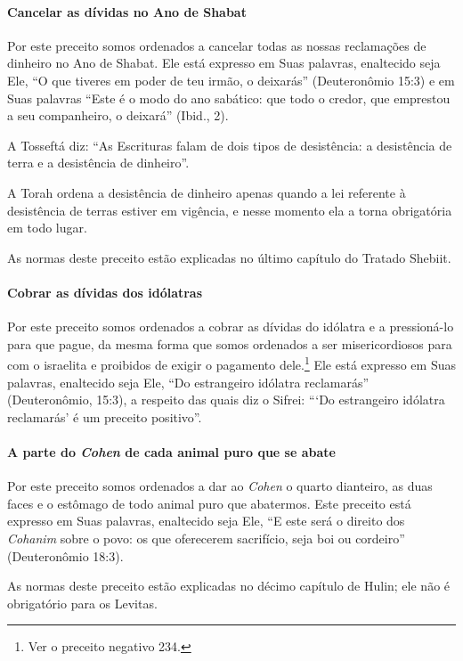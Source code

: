 \paragraph{Cancelar as dívidas no Ano de Shabat}

Por este preceito somos ordenados a cancelar todas as nossas
reclamações de dinheiro no Ano de Shabat. Ele está expresso em Suas
palavras, enaltecido seja Ele, ``O que tiveres em poder de teu irmão, o
deixarás'' (Deuteronômio 15:3) e em Suas palavras ``Este é o modo do
ano sabático: que todo o credor, que emprestou a seu companheiro, o
deixará'' (Ibid., 2).

A Tosseftá diz: ``As Escrituras falam de dois tipos de desistência: a
desistência de terra e a desistência de dinheiro''.

A Torah ordena a desistência de dinheiro apenas quando a lei referente
à desistência de terras estiver em vigência, e nesse momento ela a torna
obrigatória em todo lugar.

As normas deste preceito estão explicadas no último capítulo do Tratado
Shebiit.

\paragraph{Cobrar as dívidas dos idólatras}

Por este preceito somos ordenados a cobrar as dívidas do idólatra e a
pressioná-lo para que pague, da mesma forma que somos ordenados a ser
misericordiosos para com o israelita e proibidos de exigir o pagamento
dele.\footnote{Ver o preceito negativo 234.} Ele está expresso em Suas palavras,
enaltecido seja Ele, ``Do estrangeiro idólatra reclamarás''
(Deuteronômio, 15:3), a respeito das quais diz o Sifrei: ```Do
estrangeiro idólatra reclamarás' é um preceito positivo''.

\paragraph{A parte do \textit{Cohen} de cada animal puro que se abate}

Por este preceito somos ordenados a dar ao \textit{Cohen} o quarto
dianteiro, as duas faces e o estômago de todo animal puro que
abatermos. Este preceito está expresso em Suas palavras, enaltecido
seja Ele, ``E este será o direito dos \textit{Cohanim} sobre o povo: os que
oferecerem sacrifício, seja boi ou cordeiro'' (Deuteronômio 18:3).

As normas deste preceito estão explicadas no décimo capítulo de Hulin;
ele não é obrigatório para os Levitas.

